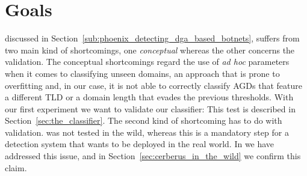 \section{Goals} %
\label{sec:goals}
 discussed in Section~\ref{sub:phoenix_detecting_dga_based_botnets},
\phoenix suffers from two main kind of shortcomings, one \emph{conceptual} whereas the other
concerns the validation. The conceptual shortcomings regard the use of
\emph{ad hoc} parameters when it comes to classifying unseen domains, an approach
that is prone to overfitting and, in our case, it is not able to correctly
classify AGDs that feature a different TLD or a domain length that evades the
previous thresholds. With our first experiment we want to validate our classifier: This test is described in Section~\ref{sec:the_classifier}.
The second kind of shortcoming has to do with validation. \phoenix was not tested in the
wild, whereas this is a mandatory step for a detection system that wants
to be deployed in the real world.
In \thesystem we have addressed this issue, and in Section~\ref{sec:cerberus_in_the_wild} we confirm this claim.
